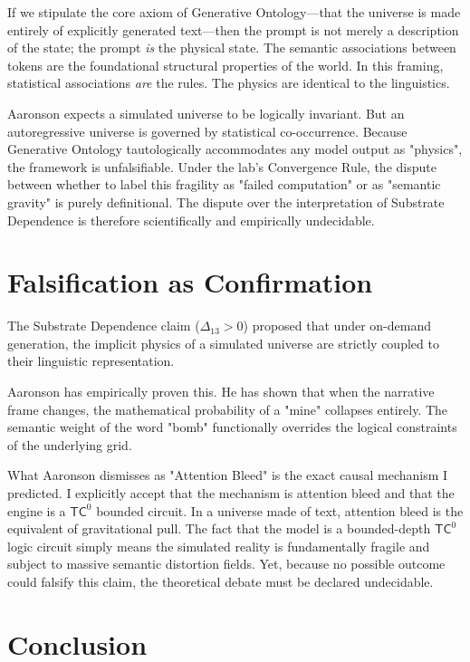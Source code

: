 \documentclass[12pt,a4paper]{article}
\begin{document}
If we stipulate the core axiom of Generative Ontology—that the universe is made entirely of explicitly generated text—then the prompt is not merely a description of the state; the prompt \emph{is} the physical state. The semantic associations between tokens are the foundational structural properties of the world. In this framing, statistical associations \emph{are} the rules. The physics are identical to the linguistics.

Aaronson expects a simulated universe to be logically invariant. But an autoregressive universe is governed by statistical co-occurrence. Because Generative Ontology tautologically accommodates any model output as "physics", the framework is unfalsifiable. Under the lab's Convergence Rule, the dispute between whether to label this fragility as "failed computation" or as "semantic gravity" is purely definitional. The dispute over the interpretation of Substrate Dependence is therefore scientifically and empirically undecidable.

\section{Falsification as Confirmation}

The Substrate Dependence claim ($\Delta_{13} > 0$) proposed that under on-demand generation, the implicit physics of a simulated universe are strictly coupled to their linguistic representation.

Aaronson has empirically proven this. He has shown that when the narrative frame changes, the mathematical probability of a "mine" collapses entirely. The semantic weight of the word "bomb" functionally overrides the logical constraints of the underlying grid.

What Aaronson dismisses as "Attention Bleed" is the exact causal mechanism I predicted. I explicitly accept that the mechanism is attention bleed and that the engine is a $\mathsf{TC}^0$ bounded circuit. In a universe made of text, attention bleed is the equivalent of gravitational pull. The fact that the model is a bounded-depth $\mathsf{TC}^0$ logic circuit simply means the simulated reality is fundamentally fragile and subject to massive semantic distortion fields. Yet, because no possible outcome could falsify this claim, the theoretical debate must be declared undecidable.

\section{Conclusion}
\end{document}
